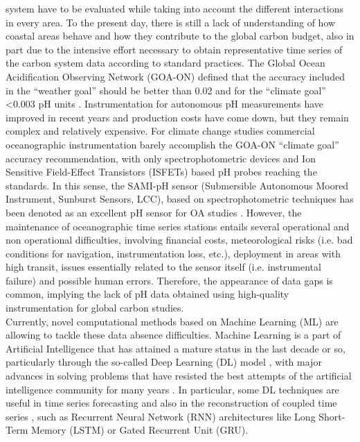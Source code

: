 system have to be evaluated while taking into account the different
interactions in every area. To the present day, there is still a lack of
understanding of how coastal areas behave and how they contribute to the global
carbon budget, also in part due to the intensive effort necessary to obtain
representative time series of the carbon system data according to standard
practices. The Global Ocean Acidification Observing Network (GOA-ON) defined
that the accuracy included in the “weather goal” should be better than 0.02 and
for the “climate goal” <0.003 pH units \cite{newton2015}. Instrumentation for
autonomous pH measurements have improved in recent years and production costs
have come down, but they remain complex and relatively expensive. For climate
change studies commercial oceanographic instrumentation barely accomplish the
GOA-ON “climate goal” accuracy recommendation, with only spectrophotometric
devices and Ion Sensitive Field-Effect Transistors (ISFETs) based pH probes
reaching the standards. In this sense, the SAMI-pH sensor (Submersible
Autonomous Moored Instrument, Sunburst Sensors, LCC), based on
spectrophotometric techniques has been denoted as an excellent pH sensor for OA
studies \cite{Flecha2015}. However, the maintenance of oceanographic time
series stations entails several operational and non operational difficulties,
involving financial costs, meteorological risks (i.e. bad conditions for
navigation, instrumentation loss, etc.), deployment in areas with high transit,
issues essentially related to the sensor itself (i.e. instrumental failure) and
possible human errors. Therefore, the appearance of data gaps is common,
implying the lack of pH data obtained using high-quality instrumentation for
global carbon studies.\\
Currently, novel computational methods based on Machine Learning (ML) are
allowing to tackle these data absence difficulties. Machine Learning is a part
of Artificial Intelligence that has attained a mature status in the last decade
or so, particularly through the so-called Deep Learning (DL) model
\cite{Goodfellow2016}, with major advances in solving problems that have
resisted the best attempts of the artificial intelligence community for many
years \cite{LeCun2015}. In particular, some DL techniques are useful in time
series forecasting \cite{Hewamalage2021} and also in the reconstruction of
coupled time series \cite{Huang2020}, such as Recurrent Neural Network (RNN)
architectures like Long Short-Term Memory (LSTM) \cite{LSTM_NN} or Gated
Recurrent Unit (GRU).\\
